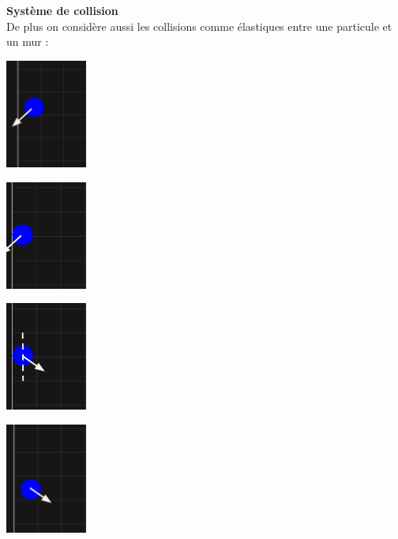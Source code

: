 \documentclass{article}
\begin{document}
\newpage
\vspace*{2pt}
\thispagestyle{landscape}
\textbf{Système de collision}\\
De plus on considère aussi les collisions comme élastiques entre une particule et un mur : \\[64pt]
\parbox{0.25\textwidth}{
    \includegraphics[width=0.20\textwidth]{CollisionM1.png}
}
\parbox{0.25\textwidth}{
    \includegraphics[width=0.20\textwidth]{CollisionM2.png}
}
\parbox{0.25\textwidth}{
    \includegraphics[width=0.20\textwidth]{CollisionM3.png}
}
\parbox{0.25\textwidth}{
    \includegraphics[width=0.20\textwidth]{CollisionM4.png}
}

\newpage
\vspace*{2pt}
\thispagestyle{landscape}
\end{document}

